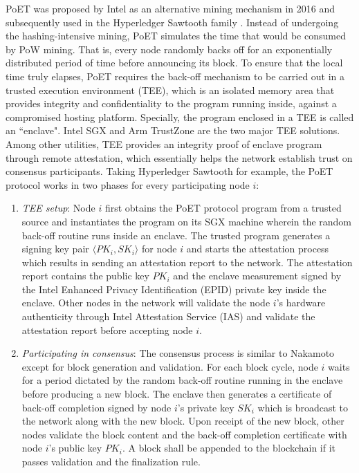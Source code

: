 PoET was proposed by Intel as an alternative mining mechanism in 2016 and subsequently used in the Hyperledger Sawtooth family . Instead of undergoing the hashing-intensive mining, PoET simulates the time that would be consumed by PoW mining. That is, every node randomly backs off for an exponentially distributed period of time before announcing its block. To ensure that the local time truly elapses, PoET requires the back-off mechanism to be carried out in a trusted execution environment (TEE), which is an isolated memory area that provides integrity and confidentiality to the program running inside, against a compromised hosting platform. Specially, the program enclosed in a TEE is called an ``enclave". Intel SGX  and Arm TrustZone  are the two major TEE solutions. Among other utilities, TEE provides an integrity proof of enclave program through remote attestation, which essentially helps the network establish trust on consensus participants. 
Taking Hyperledger Sawtooth for example, the PoET protocol works in two phases for every participating node $i$:
\begin{enumerate}
    \item \textit{TEE setup}: Node $i$ first obtains the PoET protocol program from a trusted source and instantiates the program on its SGX machine wherein the random back-off routine runs inside an enclave. The trusted program generates a signing key pair $\langle PK_i,SK_i \rangle$ for node $i$ and starts the attestation process which results in sending an attestation report to the network. The attestation report contains the public key $PK_i$ and the enclave measurement signed by the Intel Enhanced Privacy Identification (EPID) private key inside the enclave. Other nodes in the network will validate the node $i$'s hardware authenticity through Intel Attestation Service (IAS) and validate the attestation report before accepting node $i$.
    \item \textit{Participating in consensus}: The consensus process is similar to Nakamoto except for block generation and validation. For each block cycle, node $i$ waits for a period dictated by the random back-off routine running in the enclave before producing a new block. The enclave then generates a certificate of back-off completion signed by node $i$'s private key $SK_i$ which is broadcast to the network along with the new block. Upon receipt of the new block, other nodes validate the block content and the back-off completion certificate with node $i$'s public key $PK_i$. A block shall be appended to the blockchain if it passes validation and the finalization rule.
\end{enumerate}
